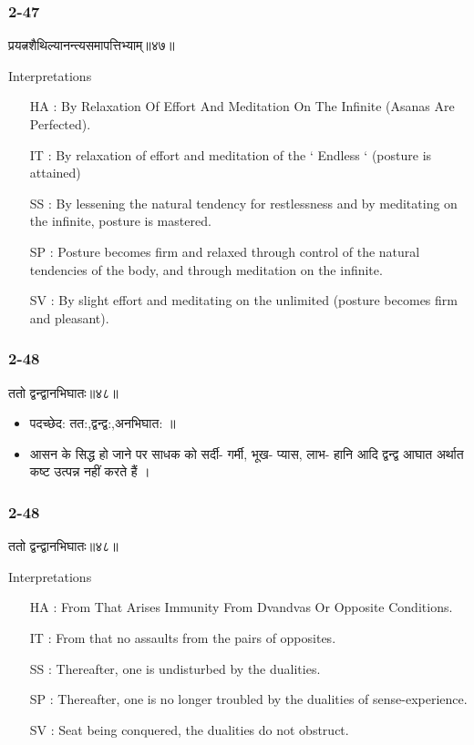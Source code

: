 \begin{frame}[fragile]\frametitle{2-47}
\begin{sanskrit}
प्रयत्नशैथिल्यानन्त्यसमापत्तिभ्याम्॥४७॥
\end{sanskrit}

Interpretations
\begin{itemize}
\item [HA]: By Relaxation Of Effort And Meditation On The Infinite (Asanas Are Perfected).
\item [IT]: By relaxation of effort and meditation of the ‘ Endless ‘ (posture is attained)
\item [SS]: By lessening the natural tendency for restlessness and by meditating on the infinite, posture is mastered.
\item [SP]: Posture becomes firm and relaxed through control of the natural tendencies of the body, and through meditation on the infinite.
\item [SV]: By slight effort and meditating on the unlimited (posture becomes firm and pleasant). 
\end{itemize}
\end{frame}

\begin{frame}[fragile]\frametitle{2-48}
\begin{sanskrit}
ततो द्वन्द्वानभिघातः॥४८॥
\end{sanskrit}

\begin{itemize}
\item पदच्छेद: तत:,द्वन्द्व:,अनभिघात: ॥ 
\item आसन के सिद्ध हो जाने पर साधक को सर्दी- गर्मी, भूख- प्यास, लाभ- हानि आदि द्वन्द्व आघात अर्थात कष्ट उत्पन्न नहीं करते हैं ।
\end{itemize}	
\end{frame}



\begin{frame}[fragile]\frametitle{2-48}
\begin{sanskrit}
ततो द्वन्द्वानभिघातः॥४८॥
\end{sanskrit}

Interpretations
\begin{itemize}
\item [HA]: From That Arises Immunity From Dvandvas Or Opposite Conditions.
\item [IT]: From that no assaults from the pairs of opposites.
\item [SS]: Thereafter, one is undisturbed by the dualities.
\item [SP]: Thereafter, one is no longer troubled by the dualities of sense-experience.
\item [SV]: Seat being conquered, the dualities do not obstruct. 
\end{itemize}
\end{frame}

